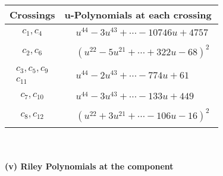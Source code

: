 \documentclass[1p]{elsarticle_modified}
\theoremstyle{definition}
\begin{document}
\begin{tabular}{m{50pt}|m{274pt}}
Crossings & \hspace{64pt}u-Polynomials at each crossing \\
\hline $$\begin{aligned}c_{1},c_{4}\end{aligned}$$&$\begin{aligned}
&u^{44}-3 u^{43}+\cdots-10746 u+4757
\end{aligned}$\\
\hline $$\begin{aligned}c_{2},c_{6}\end{aligned}$$&$\begin{aligned}
&(u^{22}-5 u^{21}+\cdots+322 u-68)^{2}
\end{aligned}$\\
\hline $$\begin{aligned}c_{3},c_{5},c_{9}\\c_{11}\end{aligned}$$&$\begin{aligned}
&u^{44}-2 u^{43}+\cdots-774 u+61
\end{aligned}$\\
\hline $$\begin{aligned}c_{7},c_{10}\end{aligned}$$&$\begin{aligned}
&u^{44}-3 u^{43}+\cdots-133 u+449
\end{aligned}$\\
\hline $$\begin{aligned}c_{8},c_{12}\end{aligned}$$&$\begin{aligned}
&(u^{22}+3 u^{21}+\cdots-106 u-16)^{2}
\end{aligned}$\\
\hline
\end{tabular}\\~\\
\newpage\renewcommand{\arraystretch}{1}
\flushleft \textbf{(v) Riley Polynomials at the component}\newline \\
\end{document}
